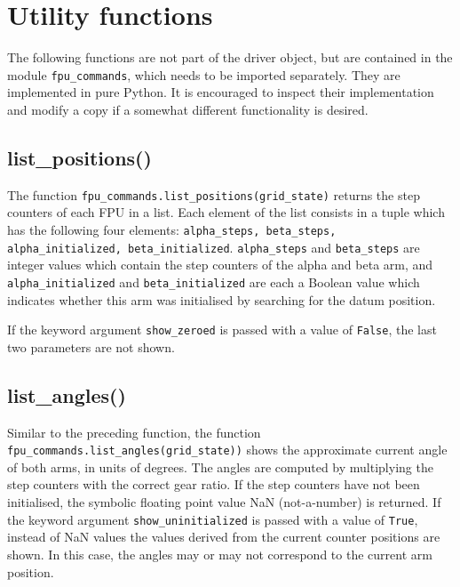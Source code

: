 \documentclass[fontsize=12,a4paper]{scrreprt}
\begin{document}
\chapter{Utility functions}

\minitoc

The following functions are not part of the driver object, but are
contained in the module \texttt{fpu\_commands}, which needs to be
imported separately. They are implemented in pure Python. It is
encouraged to inspect their implementation and modify a copy if a
somewhat different functionality is desired.

\section{list\_positions()}
\label{sec:listpositions}
 
The function \texttt{fpu\_commands.list\_positions(grid\_state)}
returns the step counters of each FPU in a list.  Each element of the
list consists in a tuple which has the following four elements:
\texttt{alpha\_steps, beta\_steps, alpha\_initialized,
  beta\_initialized}. \texttt{alpha\_steps} and \texttt{beta\_steps}
are integer values which contain the step counters of the alpha and
beta arm, and \texttt{alpha\_initialized} and
\texttt{beta\_initialized} are each a Boolean value which indicates
whether this arm was initialised by searching for the datum position.

If the keyword argument \texttt{show\_zeroed} is passed with a value of
\texttt{False}, the last two parameters are not shown.

\section{list\_angles()}
\label{sec:listangles}

Similar to the preceding function, the function
\texttt{fpu\_commands.list\_angles(grid\_state))} shows the
approximate current angle of both arms, in units of degrees. The
angles are computed by multiplying the step counters with the correct
gear ratio. If the step counters have not been initialised, the
symbolic floating point value NaN (not-a-number) is returned.  If the
keyword argument \texttt{show\_uninitialized} is passed with a value
of \texttt{True}, instead of NaN values the values derived from the
current counter positions are shown. In this case, the angles may or
may not correspond to the current arm position.
\end{document}

